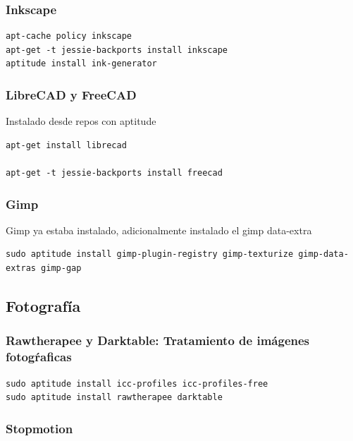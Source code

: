 \documentclass[12pt,spanish,]{article}
\begin{document}
\subsubsection{Inkscape}\label{inkscape}

\begin{verbatim}
apt-cache policy inkscape
apt-get -t jessie-backports install inkscape
aptitude install ink-generator
\end{verbatim}

\subsubsection{LibreCAD y FreeCAD}\label{librecad-y-freecad}

Instalado desde repos con aptitude

\begin{verbatim}
apt-get install librecad

apt-get -t jessie-backports install freecad
\end{verbatim}

\subsubsection{Gimp}\label{gimp}

Gimp ya estaba instalado, adicionalmente instalado el gimp data-extra

\begin{verbatim}
sudo aptitude install gimp-plugin-registry gimp-texturize gimp-data-extras gimp-gap
\end{verbatim}

\subsection{Fotografía}\label{fotografuxeda}

\subsubsection{Rawtherapee y Darktable: Tratamiento de imágenes
fotogŕaficas}\label{rawtherapee-y-darktable-tratamiento-de-imuxe1genes-fotogux155aficas}

\begin{verbatim}
sudo aptitude install icc-profiles icc-profiles-free
sudo aptitude install rawtherapee darktable
\end{verbatim}

\subsubsection{Stopmotion}\label{stopmotion}
\end{document}

